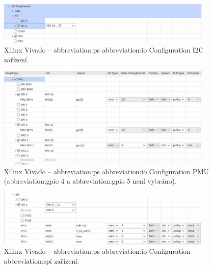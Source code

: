 \documentclass[a4paper, twoside, 11pt]{article}
\begin{document}
				\begin{figure}[htbp!]
					\centering
					\includegraphics[width=0.95\textwidth]{src/png/kr26-xilinx-vivado-flow/kr26-xilix-vivado-flow-18.jpg}
					\caption{Xilinx Vivado – \gls{abbreviation:ps} \gls{abbreviation:io} Configuration I2C zařízení.}
					\label{fig:kr26-xilix-vivado-flow-18}
				\end{figure}


				\begin{figure}[htbp!]
					\centering
					\includegraphics[width=0.95\textwidth]{src/png/kr26-xilinx-vivado-flow/kr26-xilix-vivado-flow-19.jpg}
					\caption{Xilinx Vivado – \gls{abbreviation:ps} \gls{abbreviation:io} Configuration PMU (\gls{abbreviation:gpio} 4 a \gls{abbreviation:gpio} 5 není vybráno).}
					\label{fig:kr26-xilix-vivado-flow-19}
				\end{figure}

				\begin{figure}[htbp!]
					\centering
					\includegraphics[width=0.95\textwidth]{src/png/kr26-xilinx-vivado-flow/kr26-xilix-vivado-flow-20.jpg}
					\caption{Xilinx Vivado – \gls{abbreviation:ps} \gls{abbreviation:io} Configuration \gls{abbreviation:spi} zařízení.}
					\label{fig:kr26-xilix-vivado-flow-20}
				\end{figure}
\end{document}
